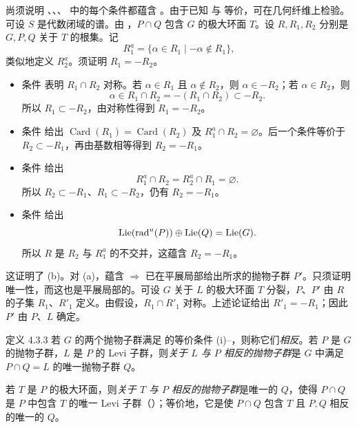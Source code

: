 尚须说明 \textup{}、\textup{}、\textup{}、\textup{} 中的每个条件都蕴含 \textup{}。由于已知 \textup{} 与 \textup{} 等价，可在几何纤维上检验。可设 \(S\) 是代数闭域的谱。由 ，\(P\cap Q\) 包含 \(G\) 的极大环面 \(T\)。设 \(R,R_1,R_2\) 分别是 \(G,P,Q\) 关于 \(T\) 的根集。记
\[
 R_1^a=\{\alpha\in R_1\mid-\alpha\notin R_1\},
\]
类似地定义 \(R_2^a\)。须证明 \(R_1=-R_2\)。
\begin{itemize}[leftmargin=2em]
\item 条件 \textup{} 表明 \(R_1\cap R_2\) 对称。若 \(\alpha\in R_1\) 且 \(\alpha\notin R_2\)，则 \(\alpha\in-R_2\)；若 \(\alpha\in R_2\)，则
\[
 \alpha\in R_1\cap R_2=-(R_1\cap R_2)\subset-R_2.
\]
所以 \(R_1\subset-R_2\)，由对称性得到 \(R_1=-R_2\)。
\item 条件 \textup{} 给出 \(\operatorname{Card}(R_1)=\operatorname{Card}(R_2)\) 及 \(R_1^a\cap R_2=\varnothing\)。后一个条件等价于 \(R_2\subset-R_1\)，再由基数相等得到 \(R_2=-R_1\)。
\item 条件 \textup{} 给出
\[
 R_1^a\cap R_2=R_2^a\cap R_1=\varnothing.
\]
所以 \(R_2\subset-R_1\)、\(R_1\subset-R_2\)，仍有 \(R_2=-R_1\)。
\item 条件 \textup{} 给出
\[
 \operatorname{Lie}(\operatorname{rad}^u(P))\oplus\operatorname{Lie}(Q)
 =\operatorname{Lie}(G).
\]
所以 \(R\) 是 \(R_2\) 与 \(R_1^a\) 的不交并，这蕴含 \(R_2=-R_1\)。
\end{itemize}

这证明了 (b)。对 (a)，蕴含 \textup{} \(\Rightarrow\) \textup{} 已在平展局部给出所求的抛物子群 \(P'\)。只须证明唯一性，而这也是平展局部的。可设 \(G\) 关于 \(L\) 的极大环面 \(T\) 分裂，\(P\)、\(P'\) 由 \(R\) 的子集 \(R_1\)、\(R'_1\) 定义。由假设，\(R_1\cap R'_1\) 对称。上述论证给出 \(R'_1=-R_1\)；因此 \(P'\) 由 \(P\)、\(L\) 确定。
\SGAQED

\begin{sgastatement}{定义 4.3.3}
若 \(G\) 的两个抛物子群满足 的等价条件 \textup{(i)}--\textup{}，则称它们\emph{相反}。若 \(P\) 是 \(G\) 的抛物子群，\(L\) 是 \(P\) 的 Levi 子群，则\emph{关于 \(L\) 与 \(P\) 相反的抛物子群}是 \(G\) 中满足 \(P\cap Q=L\) 的唯一抛物子群 \(Q\)。

若 \(T\) 是 \(P\) 的极大环面，则\emph{关于 \(T\) 与 \(P\) 相反的抛物子群}是唯一的 \(Q\)，使得 \(P\cap Q\) 是 \(P\) 中包含 \(T\) 的唯一 Levi 子群（）；等价地，它是使 \(P\cap Q\) 包含 \(T\) 且 \(P,Q\) 相反的唯一的 \(Q\)。
\end{sgastatement}

